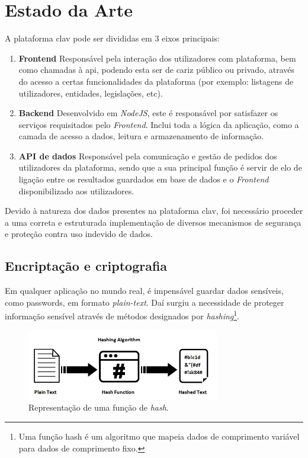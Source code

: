 \chapter{Estado da Arte}
A plataforma \gls{clav} pode ser divididas em 3 eixos principais:

\begin{enumerate}
    \item \textbf{Frontend}
    Responsável pela interação dos utilizadores com plataforma, bem como chamadas à \gls{api}, podendo esta ser de cariz público ou privado, através do acesso a certas funcionalidades da plataforma (por exemplo: listagens de utilizadores, entidades, legislações, etc).
    
    \item \textbf{Backend}
    Desenvolvido em \emph{NodeJS}, este é responsável por satisfazer os serviços requisitados pelo \emph{Frontend}. Inclui toda a lógica da aplicação, como a camada de acesso a dados, leitura e armazenamento de informação.
    
    \item \textbf{API de dados}
    Responsável pela comunicação e gestão de pedidos dos utilizadores da plataforma, sendo que a sua principal função é servir de elo de ligação entre os resultados guardados em base de dados e o \emph{Frontend} disponibilizado aos utilizadores.
\end{enumerate}

Devido à natureza dos dados presentes na plataforma \gls{clav}, foi necessário proceder a uma correta e estruturada implementação de diversos mecanismos de segurança e proteção contra uso indevido de dados.

\cleardoublepage
\section{Encriptação e criptografia}

Em qualquer aplicação no mundo real, é impensável guardar dados sensíveis, como passwords, em formato \emph{plain-text}. Daí surgiu a necessidade de proteger informação sensível através de métodos designados por \emph{hashing}\footnote{Uma função hash é um algoritmo que mapeia dados de comprimento variável para dados de comprimento fixo.}.\\

\begin{figure}[h]
    \centering
    \includegraphics[width=0.75\textwidth]{img/bcrypt/Hashing.png}
    \caption{Representação de uma função de \emph{hash}.\cite{hashFunction}}
\end{figure}

